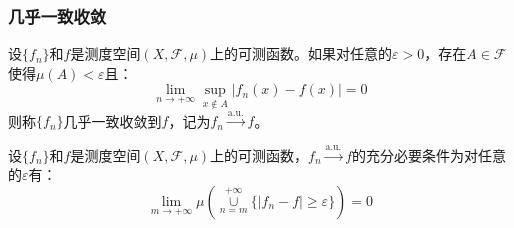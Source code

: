 \subsubsection{几乎一致收敛}
\begin{definition}
	设$\{f_n\}$和$f$是测度空间$(X,\mathscr{F},\mu)$上的可测函数。如果对任意的$\varepsilon>0$，存在$A\in\mathscr{F}$使得$\mu(A)<\varepsilon$且：
	\begin{equation*}
		\lim_{n\to+\infty}\sup_{x\notin A}|f_n(x)-f(x)|=0
	\end{equation*}
	则称$\{f_n\}$几乎一致收敛到$f$，记为$f_n\overset{\text{a.u.}}{\longrightarrow}f$。
\end{definition}
\begin{theorem}\label{theo:EquiConditiona.u.}
	设$\{f_n\}$和$f$是测度空间$(X,\mathscr{F},\mu)$上的可测函数，$f_n\overset{\text{a.u.}}{\longrightarrow}f$的充分必要条件为对任意的$\varepsilon$有：
	\begin{equation*}
		\lim_{m\to+\infty}\mu\left(\underset{n=m}{\overset{+\infty}{\cup}}\{|f_n-f|\geqslant\varepsilon\}\right)=0
	\end{equation*}
\end{theorem}
